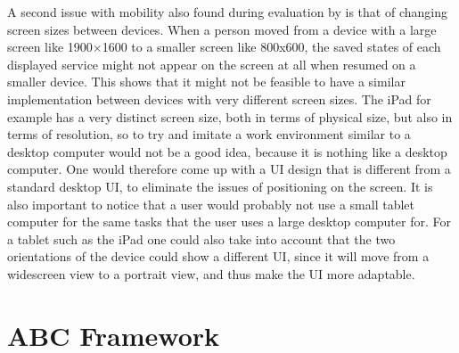 A second issue with mobility also found during evaluation by \citet{bardram2009} is that of changing screen sizes between devices. When a person moved from a device with a large screen like 1900×1600 to a smaller screen like 800x600, the saved states of each displayed service might not appear on the screen at all when resumed on a smaller device. This shows that it might not be feasible to have a similar implementation between devices with very different screen sizes. The iPad for example has a very distinct screen size, both in terms of physical size, but also in terms of resolution, so to try and imitate a work environment similar to a desktop computer would not be a good idea, because it is nothing like a desktop computer. One would therefore come up with a UI design that is different from a standard desktop UI, to eliminate the issues of positioning on the screen. It is also important to notice that a user would probably not use a small tablet computer for the same tasks that the user uses a large desktop computer for. For a tablet such as the iPad one could also take into account that the two orientations of the device could show a different UI, since it will move from a widescreen view to a portrait view, and thus make the UI more adaptable.

\section{ABC Framework}

